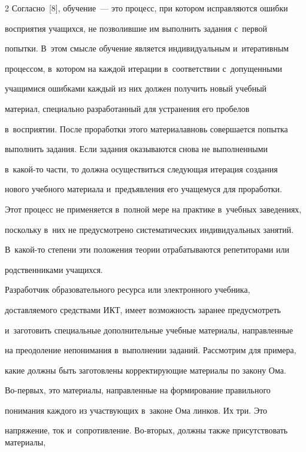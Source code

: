 \begin{multicols}{2}
  Согласно~[8], обучение~--- это процесс, при котором исправляются ошибки 


восприятия учащихся, не позволившие им выполнить задания с~первой\linebreak 


попытки. В~этом смысле обучение является индивидуальным и~итеративным 


процессом, в~котором на каждой итерации в~соответствии с~допущенными 


учащимися ошибками каждый из них должен получить новый учебный 


материал, специально разработанный для устранения его пробелов 


в~восприятии. После проработки этого материала\linebreak вновь совершается попытка 


выполнить задания. Если задания оказываются снова не выполненными  


в~ка\-кой-то части, то должна осуществиться следующая итерация создания 


нового учебного материала и~предъявления его учащемуся для проработки. 


Этот процесс не применяется в~полной мере на практике в~учебных заведениях, 


поскольку в~них не предусмотрено систематических индивидуальных занятий. 


В~ка\-кой-то степени эти положения теории отрабатываются репетиторами или 


родственниками учащихся.


  


  Разработчик образовательного ресурса или электронного учебника, 


доставляемого средствами ИКТ, имеет возможность заранее предусмотреть 


и~заготовить специальные дополнительные учебные материалы, направленные 


на преодоление непонимания в~выполнении заданий. Рассмотрим для примера, 


какие должны быть заготовлены корректирующие материалы по закону Ома. 


Во-пер\-вых, это материалы, направленные на формирование правильного 


понимания каждого из участвующих в~законе Ома линков. Их три. Это 


напряжение, ток и~сопротивление. Во-вто\-рых, должны также присутствовать материалы, 



\end{multicols}
